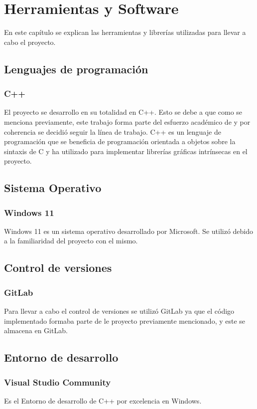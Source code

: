\chapter{Herramientas y Software}
\label{chap:hs}
En este capítulo se explican las herramientas y librerías utilizadas para llevar a cabo el proyecto.
\section{Lenguajes de programación}
    \subsection{C++}    
El proyecto se desarrollo en su totalidad en C++. Esto se debe a que como se menciona previamente, este trabajo forma parte del esfuerzo académico de \citeauthor{IglesiasGuitian2022} y por coherencia se decidió seguir la línea de trabajo.
C++ es un lenguaje de programación que se beneficia de programación orientada a objetos sobre la sintaxis de C y ha utilizado para implementar librerías gráficas intrínsecas en el proyecto.

\section{Sistema Operativo}
\subsection{Windows 11}
Windows 11 es un sistema operativo desarrollado por Microsoft. Se utilizó debido a la familiaridad del proyecto con el mismo.
\section{Control de versiones}
    \subsection{GitLab}
Para llevar a cabo el control de versiones se utilizó GitLab ya que el código implementado formaba parte de le proyecto previamente mencionado, y este se almacena en GitLab.
\section{Entorno de desarrollo}
    \subsection{Visual Studio Community}
Es el Entorno de desarrollo de C++ por excelencia en Windows.
